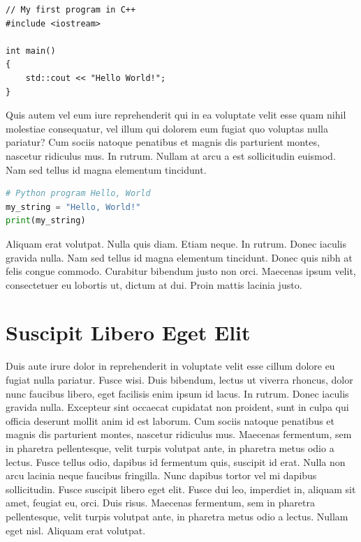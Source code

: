 \documentclass[english,master,dept460,male,cpp,cpdeclaration]{diploma}
\begin{document}
\begin{lstlisting}[label=src:CppListing,caption={Program Hello world in C++ language}]
// My first program in C++
#include <iostream>

int main()
{
	std::cout << "Hello World!";
}
\end{lstlisting}

Quis autem vel eum iure reprehenderit qui in ea voluptate velit esse quam nihil molestiae consequatur, vel illum qui dolorem eum fugiat quo voluptas nulla pariatur? Cum sociis natoque penatibus et magnis dis parturient montes, nascetur ridiculus mus. In rutrum. Nullam at arcu a est sollicitudin euismod. Nam sed tellus id magna elementum tincidunt.

\begin{lstlisting}[language=Python,label=src:PythonListing,caption={Program Hello world in Python language}]
# Python program Hello, World
my_string = "Hello, World!"
print(my_string)
\end{lstlisting}

Aliquam erat volutpat. Nulla quis diam. Etiam neque. In rutrum. Donec iaculis gravida nulla. Nam sed tellus id magna elementum tincidunt. Donec quis nibh at felis congue commodo. Curabitur bibendum justo non orci. Maecenas ipsum velit, consectetuer eu lobortis ut, dictum at dui. Proin mattis lacinia justo.


\section{Suscipit Libero Eget Elit}
Duis aute irure dolor in reprehenderit in voluptate velit esse cillum dolore eu fugiat nulla pariatur. Fusce wisi. Duis bibendum, lectus ut viverra rhoncus, dolor nunc faucibus libero, eget facilisis enim ipsum id lacus. In rutrum. Donec iaculis gravida nulla. Excepteur sint occaecat cupidatat non proident, sunt in culpa qui officia deserunt mollit anim id est laborum. Cum sociis natoque penatibus et magnis dis parturient montes, nascetur ridiculus mus. Maecenas fermentum, sem in pharetra pellentesque, velit turpis volutpat ante, in pharetra metus odio a lectus. Fusce tellus odio, dapibus id fermentum quis, suscipit id erat. Nulla non arcu lacinia neque faucibus fringilla. Nunc dapibus tortor vel mi dapibus sollicitudin. Fusce suscipit libero eget elit. Fusce dui leo, imperdiet in, aliquam sit amet, feugiat eu, orci. Duis risus. Maecenas fermentum, sem in pharetra pellentesque, velit turpis volutpat ante, in pharetra metus odio a lectus. Nullam eget nisl. Aliquam erat volutpat.
\end{document}
